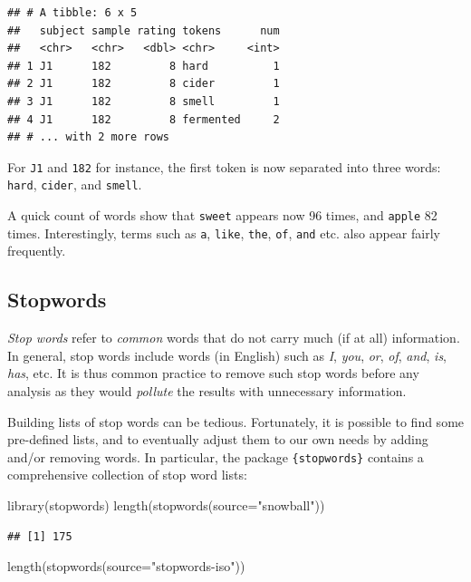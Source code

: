 \documentclass[
]{krantz}
\makeatletter
\newenvironment{Shaded}{\begin{snugshade}}{\end{snugshade}}
\newcommand{\AttributeTok}[1]{\textcolor[rgb]{0.61,0.61,0.61}{#1}}
\newcommand{\FunctionTok}[1]{\textcolor[rgb]{0,0,0}{#1}}
\newcommand{\NormalTok}[1]{#1}
\newcommand{\StringTok}[1]{\textcolor[rgb]{0.5,0.5,0.5}{#1}}
\newenvironment{kframe}{%
\medskip{}
\setlength{\fboxsep}{.8em}
 \def\at@end@of@kframe{}%
 \ifinner\ifhmode%
  \def\at@end@of@kframe{\end{minipage}}%
  \begin{minipage}{\columnwidth}%
 \fi\fi%
 \def\FrameCommand##1{\hskip\@totalleftmargin \hskip-\fboxsep
 \colorbox{shadecolor}{##1}\hskip-\fboxsep
     \hskip-\linewidth \hskip-\@totalleftmargin \hskip\columnwidth}%
 \MakeFramed {\advance\hsize-\width
   \@totalleftmargin\z@ \linewidth\hsize
   \@setminipage}}%
 {\par\unskip\endMakeFramed%
 \at@end@of@kframe}
\renewenvironment{Shaded}{\begin{kframe}}{\end{kframe}}
\makeatother
\begin{document}
\begin{verbatim}
## # A tibble: 6 x 5
##   subject sample rating tokens      num
##   <chr>   <chr>   <dbl> <chr>     <int>
## 1 J1      182         8 hard          1
## 2 J1      182         8 cider         1
## 3 J1      182         8 smell         1
## 4 J1      182         8 fermented     2
## # ... with 2 more rows
\end{verbatim}

For \texttt{J1} and \texttt{182} for instance, the first token is now separated into three words: \texttt{hard}, \texttt{cider}, and \texttt{smell}.

A quick count of words show that \texttt{sweet} appears now 96 times, and \texttt{apple} 82 times. Interestingly, terms such as \texttt{a}, \texttt{like}, \texttt{the}, \texttt{of}, \texttt{and} etc. also appear fairly frequently.

\hypertarget{stopwords}{%
\subsection{Stopwords}\label{stopwords}}

\emph{Stop words} refer to \emph{common} words that do not carry much (if at all) information. In general, stop words include words (in English) such as \emph{I}, \emph{you}, \emph{or}, \emph{of}, \emph{and}, \emph{is}, \emph{has}, etc. It is thus common practice to remove such stop words before any analysis as they would \emph{pollute} the results with unnecessary information.

Building lists of stop words can be tedious. Fortunately, it is possible to find some pre-defined lists, and to eventually adjust them to our own needs by adding and/or removing words. In particular, the package \texttt{\{stopwords\}} contains a comprehensive collection of stop word lists:

\begin{Shaded}
\begin{Highlighting}[]
\FunctionTok{library}\NormalTok{(stopwords)}
\FunctionTok{length}\NormalTok{(}\FunctionTok{stopwords}\NormalTok{(}\AttributeTok{source=}\StringTok{"snowball"}\NormalTok{))}
\end{Highlighting}
\end{Shaded}

\begin{verbatim}
## [1] 175
\end{verbatim}

\begin{Shaded}
\begin{Highlighting}[]
\FunctionTok{length}\NormalTok{(}\FunctionTok{stopwords}\NormalTok{(}\AttributeTok{source=}\StringTok{"stopwords{-}iso"}\NormalTok{))}
\end{Highlighting}
\end{Shaded}
\end{document}
